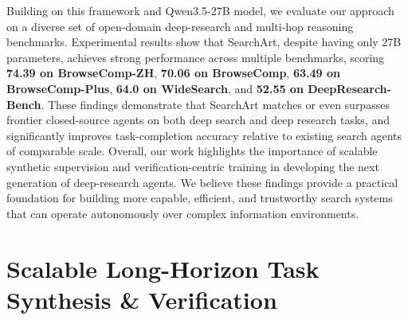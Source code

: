 \documentclass{huawei}
\begin{document}
Building on this framework and Qwen3.5-27B model, we evaluate our approach on a diverse set of open-domain deep-research and multi-hop reasoning benchmarks. 
Experimental results show that SearchArt, despite having only 27B parameters, achieves strong performance across multiple benchmarks, scoring \textbf{74.39 on BrowseComp-ZH}, \textbf{70.06 on BrowseComp}, \textbf{63.49 on BrowseComp-Plus}, \textbf{64.0 on WideSearch}, and \textbf{52.55 on DeepResearch-Bench}.
These findings demonstrate that SearchArt matches or even surpasses frontier closed-source agents on both deep search and deep research tasks, and significantly improves task-completion accuracy relative to existing search agents of comparable scale.
Overall, our work highlights the importance of scalable synthetic supervision and verification-centric training in developing the next generation of deep-research agents. We believe these findings provide a practical foundation for building more capable, efficient, and trustworthy search systems that can operate autonomously over complex information environments.








\section{Scalable Long-Horizon Task Synthesis \& Verification}
\end{document}
